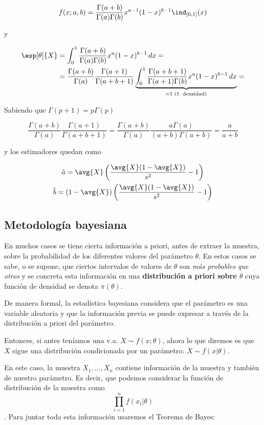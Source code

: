 \documentclass{apuntes}
\begin{document}
\[ f(x;a,b) = \frac{\Gamma(a+b)}{\Gamma(a)\Gamma(b)} x^{a-1}(1-x)^{b-1} \ind_{[0,1]}(x) \]

y

\begin{align*}
\esp[\theta]{X} &= \int_0^1\frac{\Gamma(a+b)}{\Gamma(a)\Gamma(b)} x^{a}(1-x)^{b-1}\,dx = \\
&= \frac{\Gamma(a+b)}{\Gamma(a)}\frac{\Gamma(a+1)}{\Gamma(a+b+1)}\underbrace{\int_0^1\frac{\Gamma(a+b+1)}{\Gamma(a+1)\Gamma(b)} x^{a}(1-x)^{b-1}\,dx}_{=1 \text{ (f. densidad)}} = 
\end{align*}

Sabiendo que $\Gamma(p+1) = p\Gamma(p)$

\[ \frac{\Gamma(a+b)}{\Gamma(a)}\frac{\Gamma(a+1)}{\Gamma(a+b+1)} = 
	\frac{\Gamma(a+b)}{\Gamma(a)}\frac{a\Gamma(a)}{(a+b)\Gamma(a+b)} = \frac{a}{a+b} \]
	
y los estimadores quedan como
	
\begin{gather*}
\hat{a} = \avg{X}\left(\frac{\avg{X}(1-\avg{X})}{s^2}-1\right) \\
\hat{b} = (1-\avg{X})\left(\frac{\avg{X}(1-\avg{X})}{s^2}-1\right) 
\end{gather*}

\subsection{Metodología bayesiana}

En muchos casos se tiene cierta información a priori, antes de extraer la muestra, sobre la probabilidad de los diferentes valores del parámetro $\theta$. En estos casos se sabe, o se supone, que ciertos intervalos de valores de $\theta$ son \textit{más probables que otros} y se concreta esta información en una \textbf{distribución a priori sobre $\theta$} cuya función de densidad se denota $\pi(\theta)$.

De manera formal, la estadística bayesiana considera que el parámetro es una variable aleatoria y que la información previa se puede expresar a través de la distribución a priori del parámetro.

Entonces, si antes teníamos una v.a. $X\sim f(x;\theta)$, ahora lo que diremos es que $X$ sigue una distribución condicionada por un parámetro: $X\sim f(x|\theta)$.

En este caso, la muestra $X_1,\dotsc,X_n$ contiene información de la muestra y también de nuestro parámetro. Es decir, que podemos considerar la función de distribución de la muestra como \[ \prod_{i=1}^n f(x_i|\theta) \]. Para juntar toda esta información usaremos el Teorema de Bayes:
\end{document}
